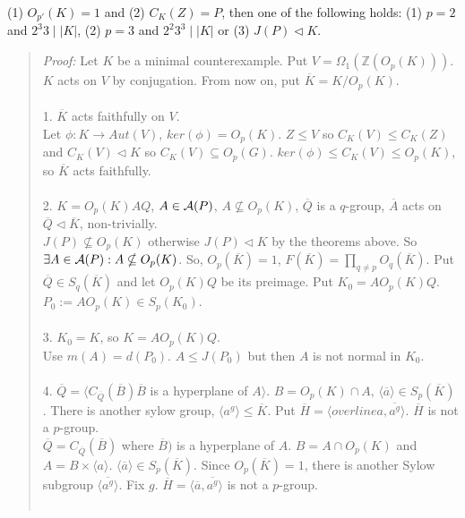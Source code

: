 (1) $O_{p'}(K) = 1$ and (2) $C_K(Z)=P$, then one of the following holds: (1) $p=2$ and $ 2^3 3 \mid |K|$, (2)
$p=3$ and $2^2 3^3 \mid |K|$ or (3) $J(P) \lhd K$.
\begin{quote}
\emph{Proof:}  Let $K$ be a minimal counterexample.  Put $V= \Omega_1({\mathbb Z}(O_p(K)))$. $K$ acts on $V$ by
conjugation. From now on, put ${\overline K} = K/O_p(K)$.
\\
\\
1. ${\overline K}$ acts faithfully on $V$.\\
Let $\phi: K \rightarrow Aut(V)$, $ker(\phi) = O_p(K)$.
$Z \leq V$ so $C_K(V) \leq C_K(Z)$ and $C_K(V) \lhd K$ so $C_K(V) \subseteq O_p(G)$.  $ ker(\phi) \leq C_K(V) \leq O_p(K)$,
so ${\overline K}$ acts faithfully.
\\
\\
2. $K= O_p(K) A Q$, $A \in {\cal A}(P)$, $A \nsubseteq O_p(K)$, ${\overline Q}$ is a $q$-group, ${\overline A}$ acts on
${\overline Q} \lhd {\overline K}$, non-trivially. \\
$J(P) \nsubseteq O_p(K)$ otherwise $J(P) \lhd K$ by the theorems above.  So $\exists A \in {\cal A}(P): A \nsubseteq O_p(K)$.
So, $O_p({\overline K}) = 1$, $F({\overline K})= \prod_{q \ne p} O_q({\overline K})$.  Put ${\overline Q} \in S_q({\overline K})$
and let $O_p(K) Q$ be its preimage.  Put $K_0 = A O_p(K)Q$.  $P_0 := A O_p(K) \in S_p(K_0)$.
\\
\\
3. $K_0=K$, so $K= A O_p(K)Q$. \\
Use $m(A)=d(P_0)$. $A \leq J(P_0)$ but then $A$ is not normal in $K_0$.
\\
\\
4. ${\overline Q} = \langle C_{\overline Q}({\overline B}) {\overline B}$ is a hyperplane of $A \rangle$.
$B= O_p(K) \cap A$, $\langle {\overline a} \rangle \in S_p({\overline K})$.  There is another sylow group,
$\langle a^g \rangle \leq {\overline K}$.  Put ${\overline H}= \langle {overline a}, {\overline {a^g}} \rangle$. ${\overline H}$
is not a $p$-group.\\
${\overline Q} =C_{\overline Q}({\overline B})$  where ${\overline B})$ is a hyperplane of $A$.
$B= A \cap O_p(K)$ and $A= B \times \langle a \rangle$. $\langle {\overline a} \rangle \in S_p({\overline K})$.
Since $O_p({\overline K})=1$, there is another Sylow subgroup $\langle {\overline {a^g}} \rangle$. Fix $g$.
${\overline H} = \langle {\overline a}, {\overline {a^g}} \rangle$ is not a $p$-group.
\\
\\

\end{quote}
